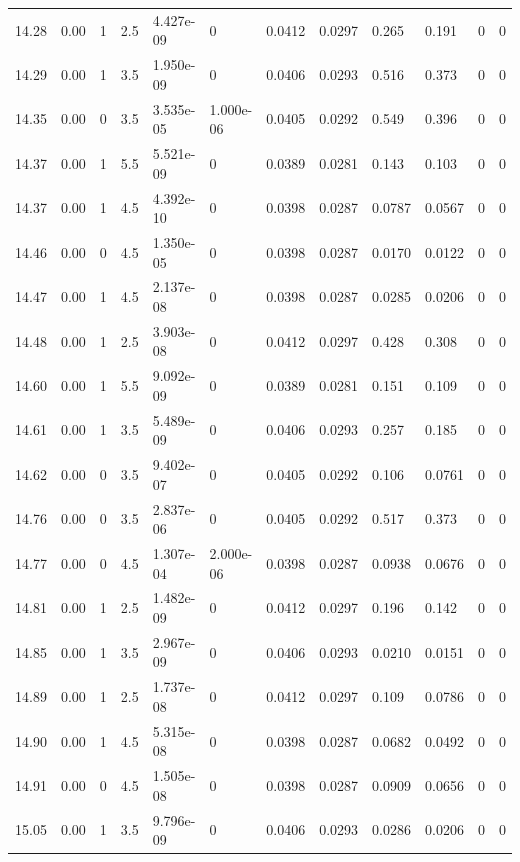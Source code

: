 \documentclass[preview]{standalone}
\begin{document}
{{{{{{{{{{\begin{tabular}{L{1.2cm}C{1.2cm} C{0.3cm}C{0.5cm} C{1.4cm}C{1.4cm} C{1.4cm}C{1.4cm} C{1.6cm}C{1.6cm} C{1.6cm}C{1.6cm}}
  14.28  &  0.00  & 1     & 2.5 &  4.427e-09  & 0  &  0.0412&   0.0297& 0.265 & 0.191   &  0 & 0  \\ 
  14.29  &  0.00  & 1     & 3.5 &  1.950e-09  & 0  &  0.0406&   0.0293& 0.516 & 0.373   &  0 & 0  \\ 
  14.35  &  0.00  & 0     & 3.5 &  3.535e-05  & 1.000e-06  &  0.0405&   0.0292& 0.549 & 0.396   &  0 & 0  \\ 
  14.37  &  0.00  & 1     & 5.5 &  5.521e-09  & 0  &  0.0389&   0.0281& 0.143 & 0.103   &  0 & 0  \\ 
  14.37  &  0.00  & 1     & 4.5 &  4.392e-10  & 0  &  0.0398&   0.0287& 0.0787 & 0.0567   &  0 & 0  \\ 
  14.46  &  0.00  & 0     & 4.5 &  1.350e-05  & 0  &  0.0398&   0.0287& 0.0170 & 0.0122   &  0 & 0  \\ 
  14.47  &  0.00  & 1     & 4.5 &  2.137e-08  & 0  &  0.0398&   0.0287& 0.0285 & 0.0206   &  0 & 0  \\ 
  14.48  &  0.00  & 1     & 2.5 &  3.903e-08  & 0  &  0.0412&   0.0297& 0.428 & 0.308   &  0 & 0  \\ 
  14.60  &  0.00  & 1     & 5.5 &  9.092e-09  & 0  &  0.0389&   0.0281& 0.151 & 0.109   &  0 & 0  \\ 
  14.61  &  0.00  & 1     & 3.5 &  5.489e-09  & 0  &  0.0406&   0.0293& 0.257 & 0.185   &  0 & 0  \\ 
  14.62  &  0.00  & 0     & 3.5 &  9.402e-07  & 0  &  0.0405&   0.0292& 0.106 & 0.0761   &  0 & 0  \\ 
  14.76  &  0.00  & 0     & 3.5 &  2.837e-06  & 0  &  0.0405&   0.0292& 0.517 & 0.373   &  0 & 0  \\ 
  14.77  &  0.00  & 0     & 4.5 &  1.307e-04  & 2.000e-06  &  0.0398&   0.0287& 0.0938 & 0.0676   &  0 & 0  \\ 
  14.81  &  0.00  & 1     & 2.5 &  1.482e-09  & 0  &  0.0412&   0.0297& 0.196 & 0.142   &  0 & 0  \\ 
  14.85  &  0.00  & 1     & 3.5 &  2.967e-09  & 0  &  0.0406&   0.0293& 0.0210 & 0.0151   &  0 & 0  \\ 
  14.89  &  0.00  & 1     & 2.5 &  1.737e-08  & 0  &  0.0412&   0.0297& 0.109 & 0.0786   &  0 & 0  \\ 
  14.90  &  0.00  & 1     & 4.5 &  5.315e-08  & 0  &  0.0398&   0.0287& 0.0682 & 0.0492   &  0 & 0  \\ 
  14.91  &  0.00  & 0     & 4.5 &  1.505e-08  & 0  &  0.0398&   0.0287& 0.0909 & 0.0656   &  0 & 0  \\ 
  15.05  &  0.00  & 1     & 3.5 &  9.796e-09  & 0  &  0.0406&   0.0293& 0.0286 & 0.0206   &  0 & 0  \\ 

\end{tabular}}}}}}}}}}}
\end{document}
